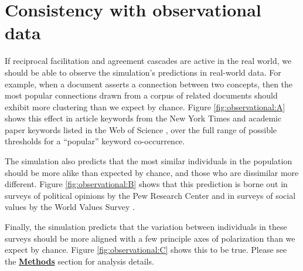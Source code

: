 \documentclass[9pt,twocolumn,twoside,lineno]{pnas-new}
\begin{document}
\section*{Consistency with observational data}
If reciprocal facilitation and agreement cascades are active in the real world, we should be able to observe the simulation’s predictions in real-world data. For example, when a document asserts a connection between two concepts, then the most popular connections drawn from a corpus of related documents should exhibit more clustering than we expect by chance. Figure \ref{fig:observational:A} shows this effect in article keywords from the New York Times \cite{gallina-etal-2019-kptimes} and academic paper keywords listed in the Web of Science \cite{kowsari2017HDLTex}, over the full range of possible thresholds for a ``popular'' keyword co-occurrence. 

The simulation also predicts that the most similar individuals in the population should be more alike than expected by chance, and those who are dissimilar more different. Figure \ref{fig:observational:B} shows that this prediction is borne out in surveys of political opinions by the Pew Research Center \cite{pew2014} and in surveys of social values by the World Values Survey \cite{wvsa2020}. 

Finally, the simulation predicts that the variation between individuals in these surveys should be more aligned with a few principle axes of polarization than we expect by chance. Figure \ref{fig:observational:C} shows this to be true. Please see the \hyperref[methods]{\textbf{Methods}} section for analysis details.
\end{document}
